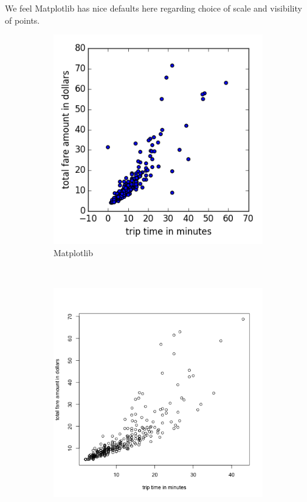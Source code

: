\documentclass[]{article}
\begin{document}
We feel Matplotlib has nice defaults here regarding choice of scale and
visibility of points.

\begin{figure}
        \centering
        \begin{subfigure}[b]{0.3\textwidth}
                \includegraphics[width=\textwidth]{matplotlib/sample.png}
                \caption{Matplotlib}
        \end{subfigure}%
        ~ %
        \begin{subfigure}[b]{0.3\textwidth}
                \includegraphics[width=\textwidth]{R/sample.png}

\end{subfigure}
\end{figure}
\end{document}
